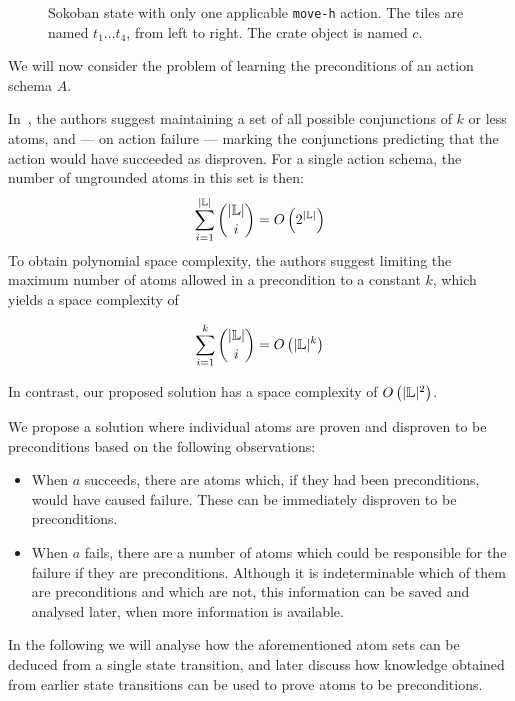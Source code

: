 \documentclass[../Master.tex]{subfiles}
\begin{document}
\begin{figure}
    \centering
    \resizebox{0.4\textwidth}{!}{}
    \caption{\label{fig:sokoSmall} Sokoban state with only one applicable \texttt{move-h} action. The tiles are named $t_1 \dots t_4$, from left to right. The crate object is named $c$.}
\end{figure}

We will now consider the problem of learning the preconditions of an action schema $A$.

In~\cite{Walsh2008}, the authors suggest maintaining a set of all possible conjunctions of $k$ or less atoms, and --- on action failure --- marking the conjunctions predicting that the action would have succeeded as disproven. For a single action schema, the number of ungrounded atoms in this set is then:
\begin{equation*}
    \sum_{i=1}^{|\mathbb{L}|} {{|\mathbb{L}|}\choose{i}} = O \left( 2^{|\mathbb{L}|} \right)
\end{equation*}
To obtain polynomial space complexity, the authors suggest limiting the maximum number of atoms allowed in a precondition to a constant $k$, which yields a space complexity of 

\begin{equation*}
    \sum_{i=1}^{k} {{|\mathbb{L}|}\choose{i}} = O \left( |\mathbb{L}|^k \right)
\end{equation*}

In contrast, our proposed solution has a space complexity of $O \left( |\mathbb{L}|^2 \right)$. 

We propose a solution where individual atoms are proven and disproven to be preconditions based on the following observations:
\begin{itemize}
    \item When $a$ succeeds, there are atoms which, if they had been preconditions, would have caused failure. These can be immediately disproven to be preconditions.
    \item When $a$ fails, there are a number of atoms which could be responsible for the failure if they are preconditions. Although it is indeterminable which of them are preconditions and which are not, this information can be saved and analysed later, when more information is available.
\end{itemize}

In the following we will analyse how the aforementioned atom sets can be deduced from a single state transition, and later discuss how knowledge obtained from earlier state transitions can be used to prove atoms to be preconditions.
\end{document}
